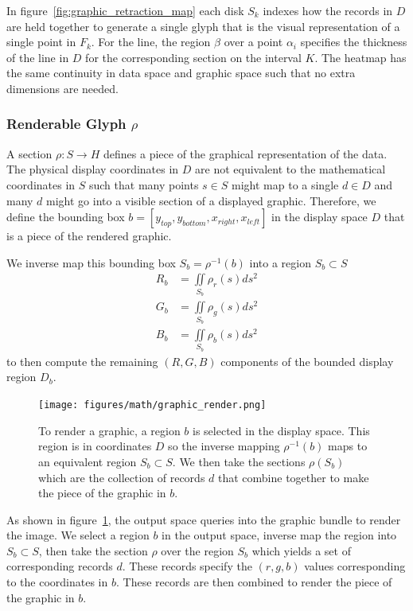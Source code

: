 \documentclass[../main.tex]{subfiles}
\begin{document}
In figure~\ref{fig:graphic_retraction_map} each disk $S_k$ indexes how the records in $D$ are held together to generate a single glyph that is the visual representation of a single point in $F_k$. For the line, the region $\beta$ over a point $\alpha_i$ specifies the thickness of the line in $D$ for the corresponding section on the interval $K$. The heatmap has the same continuity in data space and graphic space such that no extra dimensions are needed. 

 
\subsubsection{Renderable Glyph $\rho$}
\label{sec:graphic_section}

A section $\rho: S\rightarrow H$ defines a piece of the graphical representation of the data. The physical display coordinates in $D$ are not equivalent to the mathematical coordinates in $S$ such that many points $s \in S$ might map to a single $d\in D$ and many $d$ might go into a visible section of a displayed graphic. Therefore, we define the bounding box $b=\left[y_{top}, y_{bottom}, x_{right}, x_{left}\right]$ in the display space $D$ that is a piece of the rendered graphic.  

We inverse map this bounding box $S_b =\rho^{-1}(b)$ into a region $S_b \subset S$  
\begin{align}
    R_b &= \iint\limits_{S_b} \rho_r(s)ds^{2}\\
    G_b &= \iint\limits_{S_b} \rho_g(s)ds^{2}\\
    B_b &= \iint\limits_{S_b} \rho_b(s)ds^{2}
\end{align}
to then compute the remaining $(R, G, B)$ components of the bounded display region $D_b$.

\begin{figure}
    \texttt{[image: figures/math/graphic\_render.png]}
    \caption{To render a graphic, a region $b$ is selected in the display space. This region is in coordinates $D$ so the inverse mapping $\rho^{-1}(b)$ maps to an equivalent region $S_b \subset S$. We then take the sections $\rho(S_b)$ which are the collection of records $d$ that combine together to make the piece of the graphic in $b$.}
    \label{fig:graphic_rho_lookup}
\end{figure}
As shown in figure~\ref{fig:graphic_rho_lookup}, the output space queries into the graphic bundle to render the image. We select a region $b$ in the output space, inverse map the region into $S_b \subset S$, then take the section $\rho$ over the region $S_b$ which yields a set of corresponding records $d$. These records specify the $(r, g, b)$ values corresponding to the coordinates in $b$. These records are then combined to render the piece of the graphic in $b$. 
\end{document}
